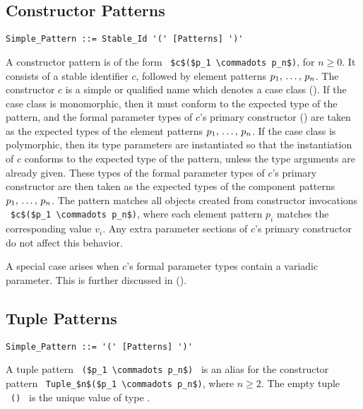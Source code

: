 \subsection{Constructor Patterns}
\label{sec:constructor-patterns}

\syntax\begin{lstlisting}
Simple_Pattern ::= Stable_Id '(' [Patterns] ')'
\end{lstlisting}

A constructor pattern is of the form ~\lstinline!$c$($p_1 \commadots p_n$)!, for $n \geq 0$. It consists of a stable identifier $c$, followed by element patterns $p_1 ,\, \ldots ,\, p_n$. The constructor $c$ is a simple or qualified name which denotes a case class (). If the case class is monomorphic, then it must conform to the expected type of the pattern, and the formal parameter types of $c$'s primary constructor () are taken as the expected types of the element patterns $p_1 ,\, \ldots ,\, p_n$. If the case class is polymorphic, then its type parameters are instantiated so that the instantiation of $c$ conforms to the expected type of the pattern, unless the type arguments are already given. These types of the formal parameter types of $c$'s primary constructor are then taken as the expected types of the component patterns $p_1 ,\, \ldots ,\, p_n$. The pattern matches all objects created from constructor invocations ~\lstinline!$c$($p_1 \commadots p_n$)!, where each element pattern $p_i$ matches the corresponding value $v_i$. Any extra parameter sections of $c$'s primary constructor do not affect this behavior. 

A special case arises when $c$'s formal parameter types contain a variadic parameter. This is further discussed in ().






\subsection{Tuple Patterns}
\label{sec:tuple-patterns}

\syntax\begin{lstlisting}
Simple_Pattern ::= '(' [Patterns] ')'
\end{lstlisting}

A tuple pattern ~\lstinline!($p_1 \commadots p_n$)!~ is an alias for the constructor pattern ~\lstinline!Tuple_$n$($p_1 \commadots p_n$)!, where $n \geq 2$. The empty tuple ~\lstinline!()!~ is the unique value of type . 





